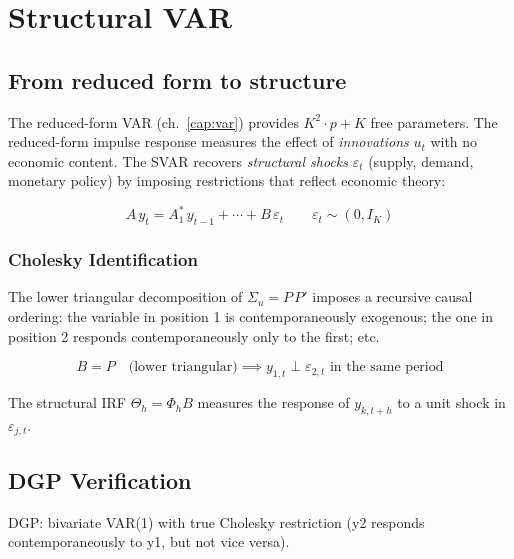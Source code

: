 \chapter{Structural VAR}
\label{cap:svar}

\section{From reduced form to structure}

The reduced-form VAR (ch.~\ref{cap:var}) provides $K^2 \cdot p + K$ free parameters.
The reduced-form impulse response measures the effect of \emph{innovations} $u_t$
with no economic content. The SVAR recovers \emph{structural shocks}
$\varepsilon_t$ (supply, demand, monetary policy) by imposing restrictions
that reflect economic theory:

\[
  A\,y_t = A_1^*\,y_{t-1} + \cdots + B\,\varepsilon_t
  \qquad
  \varepsilon_t \sim (0, I_K)
\]

\subsection*{Cholesky Identification}

The lower triangular decomposition of $\Sigma_u = P\,P'$ imposes a
recursive causal ordering: the variable in position 1 is contemporaneously
exogenous; the one in position 2 responds contemporaneously only
to the first; etc.

\[
  B = P \quad\text{(lower triangular)} \implies y_{1,t} \perp \varepsilon_{2,t} \text{ in the same period}
\]

The structural IRF $\Theta_h = \Phi_h B$ measures the response of $y_{k,t+h}$
to a unit shock in $\varepsilon_{j,t}$.

\section{DGP Verification}

DGP: bivariate VAR(1) with true Cholesky restriction (y2 responds
contemporaneously to y1, but not vice versa).

